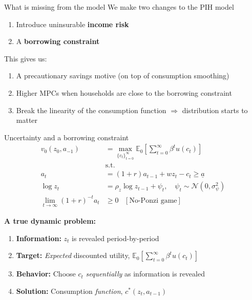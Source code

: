 \documentclass[
  10pt,
  ignorenonframetext,
  aspectratio=43,
  english,
  handout]{beamer}
\providecommand{\tightlist}{%
  \setlength{\itemsep}{0pt}\setlength{\parskip}{0pt}}
\begin{document}
\begin{frame}{What is missing from the model}
\protect{}\label{what-is-missing-from-the-model}
We make two changes to the PIH model

\begin{enumerate}
\tightlist
\item Introduce uninsurable \textbf{income risk}
\item A \textbf{borrowing constraint}
\end{enumerate}

This gives us:

\begin{enumerate}
\tightlist
\item A precautionary savings motive (on top of consumption smoothing)
\item Higher MPCs when households are close to the borrowing constraint
\item Break the linearity of the consumption function \(\Rightarrow\) distribution starts to matter
\end{enumerate}
\end{frame}

\begin{frame}{Uncertainty and a borrowing constraint}
\protect{}\label{uncertainty-and-a-borrowing-constraint}
\[
\begin{aligned}
v_{0}(z_{0},a_{-1}) & =\max_{\{c_{t}\}^{\infty}_{t=0}}\mathbb{E}_{0}\left[\sum^{\infty}_{t=0}\beta^{t}u(c_{t})\right]\\
& \text{s.t.}\\
a_{t} & =(1+r)a_{t-1}+wz_{t}-c_{t}  \geq \underline{a} \\
\log z_{t} & = \rho_{z} \log z_{t-1} + \psi_{t},\quad \psi_{t}\sim\mathcal{N}(0,\sigma^{2}_{\psi})\\
\lim_{t\rightarrow\infty}(1+r)^{-t}a_{t} & \geq0\,\,\,\,\,[\text{No-Ponzi game}]
\end{aligned}
\]

\textbf{A true dynamic problem:}

\begin{enumerate}
\tightlist
\item
  \textbf{Information:} \(z_{t}\) is revealed period-by-period
\item
  \textbf{Target:} \emph{Expected} discounted utility,
  \(\mathbb{E}_{0}\left[\sum^{\infty}_{t=0}\beta^{t}u(c_{t})\right]\)
\item
  \textbf{Behavior:} Choose \(c_{t}\) \emph{sequentially} as information
  is revealed
\item
  \textbf{Solution:} Consumption \emph{function},
  \(c^{\ast}(z_{t},a_{t-1})\)
\end{enumerate}
\end{frame}
\end{document}

